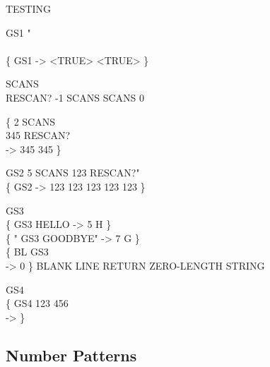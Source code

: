 \begin{tt}
TESTING   

\word{:} GS1  "   \\
\tab {}   \word{=}   \word{=} \word{;} \\
\{ GS1 -> <TRUE> <TRUE> \}

 SCANS \\
\word{:} RESCAN?  -1 SCANS \word{+!} SCANS   0  \word{!}  \word{;}

\{ 2 SCANS \word{!} \\
345 RESCAN? \\
-> 345 345 \}

\word{:} GS2  5 SCANS \word{!}  123 RESCAN?"  \word{;} \\
\{ GS2 -> 123 123 123 123 123 \}

\word{:} GS3     \word{;} \\
\{  GS3 HELLO -> 5  H \} \\
\{  " GS3 GOODBYE" -> 7  G \} \\
\{ BL GS3 \\
 -> 0 \} \tab[4]  BLANK LINE RETURN ZERO-LENGTH STRING

\word{:} GS4   \word{!}  \word{;} \\
\{ GS4 123 456 \\
-> \}
\end{tt}

\subsection{Number Patterns}

